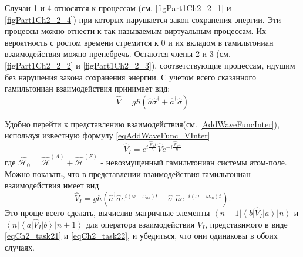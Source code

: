 Случаи 1 и 4 относятся к процессам (см. \autoref{figPart1Ch2_2_1} и
\ref{figPart1Ch2_2_4}) при которых нарушается закон сохранения энергии.
Эти процессы можно отнести к так называемым виртуальным процессам. Их
вероятность с ростом времени стремится к 0 и
их вкладом в гамильтониан взаимодействия можно
пренебречь. Остаются члены 2 и 3 (см. \autoref{figPart1Ch2_2_2} и
\ref{figPart1Ch2_2_3}), соответствующие процессам,
идущим без нарушения закона сохранения энергии. С учетом всего
сказанного гамильтониан взаимодействия принимает вид: 
\begin{equation}
\hat{V} = g \hbar \left(
\hat{a}\hat{\sigma}^{\dag} + 
\hat{a}^{\dag}\hat{\sigma}
\right)
\end{equation}

Удобно перейти к представлению взаимодействия(см. \autoref{AddWaveFuncInter}),
используя известную 
формулу \eqref{eqAddWaveFunc_VInter}
\begin{equation}
\hat{V}_I = 
e^{i \frac{\hat{\mathcal{H}}_0 t}{\hbar}}
\hat{V}
e^{- i \frac{\hat{\mathcal{H}}_0 t}{\hbar}}
\label{eqCh2_task21}
\end{equation}
где 
\(
\hat{\mathcal{H}}_0 = 
\hat{\mathcal{H}}^{\left(A\right)} +
\hat{\mathcal{H}}^{\left(F\right)}
\)
- невозмущенный гамильтониан системы атом-поле. Можно показать, что в
представлении взаимодействия гамильтониан взаимодействия имеет вид 
\begin{equation}
\hat{V}_I = 
g \hbar \left(
\hat{a}^{\dag}\hat{\sigma} e^{i \left(\omega - \omega_{ab}\right)t} +
\hat{\sigma}^{\dag} \hat{a} e^{-i \left(\omega - \omega_{ab}\right)t}
\right).
\label{eqCh2_task22}
\end{equation}
Это проще всего сделать, вычислив матричные элементы 
$\left<n +
1\right|\left<b\right|\hat{V}_I\left|a\right>\left|n\right>$ и
$\left<n\right|\left<a\right|\hat{V}_I\left|b\right>\left|n +
1\right>$ для оператора взаимодействия $\hat{V}_I$, представимого в
виде \eqref{eqCh2_task21} и \eqref{eqCh2_task22}, и убедиться, что они
одинаковы в обоих случаях.
